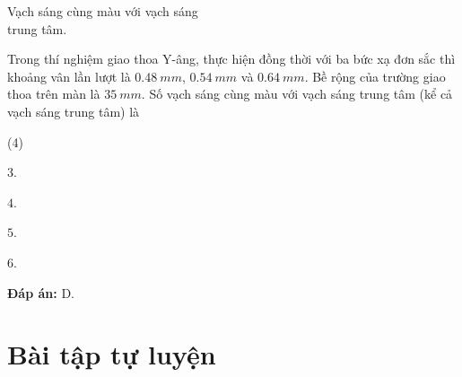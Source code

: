 \begin{dang}{Vạch sáng cùng màu với vạch sáng\\ trung tâm.}
{		Trong thí nghiệm giao thoa Y-âng, thực hiện đồng thời với ba bức xạ đơn sắc thì khoảng vân lần lượt là $ \SI{0,48}{mm} $, $ \SI{0,54}{mm} $ và $ \SI{0,64}{mm} $. Bề rộng của trường giao thoa trên màn là $ \SI{35}{mm} $. Số vạch sáng cùng màu với vạch sáng trung tâm (kể cả vạch sáng trung tâm) là
		\begin{mcq}(4)
			\item $ 3 $.
			\item $ 4 $.
			\item $ 5 $.
			\item $ 6 $.
		\end{mcq}
		
		\textbf{Đáp án:} D.
	}
\end{dang}

\section{Bài tập tự luyện}
